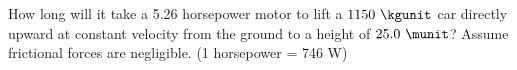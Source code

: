 How long will it take a 5.26 horsepower motor to lift a $1150\ \kgunit$ car
directly upward at constant velocity from the ground to a height of
$25.0\ \munit$? Assume frictional forces are negligible. (1 horsepower = 746 W)\answercheck
